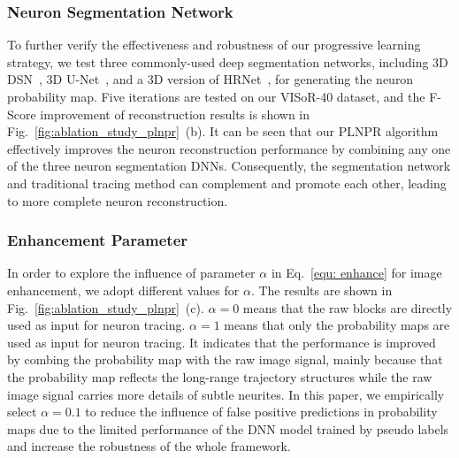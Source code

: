 \subsubsection{Neuron Segmentation Network}

To further verify the effectiveness and robustness of our progressive learning strategy, we test three commonly-used deep segmentation networks, including 3D DSN~\cite{Dou2017}, 3D U-Net~\cite{Cicek2016}, and a 3D version of HRNet~\cite{Sun2019}, for generating the neuron probability map.
Five iterations are tested on our VISoR-40 dataset, and the F-Score improvement of reconstruction results is shown in Fig.~\ref{fig:ablation_study_plnpr}~(b). 
%
It can be seen that our PLNPR algorithm effectively improves the neuron reconstruction performance by combining any one of the three neuron segmentation DNNs.
Consequently, the segmentation network and traditional tracing method can complement and promote each other, leading to more complete neuron reconstruction.


\subsubsection{Enhancement Parameter} 

In order to explore the influence of parameter $\alpha$ in Eq.~\eqref{equ: enhance} for image enhancement, we adopt different values for $\alpha$.
The results are shown in Fig.~\ref{fig:ablation_study_plnpr}~(c).
$\alpha=0$ means that the raw blocks are directly used as input for neuron tracing.
$\alpha=1$ means that only the probability maps are used as input for neuron tracing. 
It indicates that the performance is improved by combing the probability map with the raw image signal, mainly because that the probability map reflects the long-range trajectory structures while the raw image signal carries more details of subtle neurites.
In this paper, we empirically select $\alpha=0.1$ to reduce the influence of false positive predictions in probability maps due to the limited performance of the DNN model trained by pseudo labels and increase the robustness of the whole framework.

